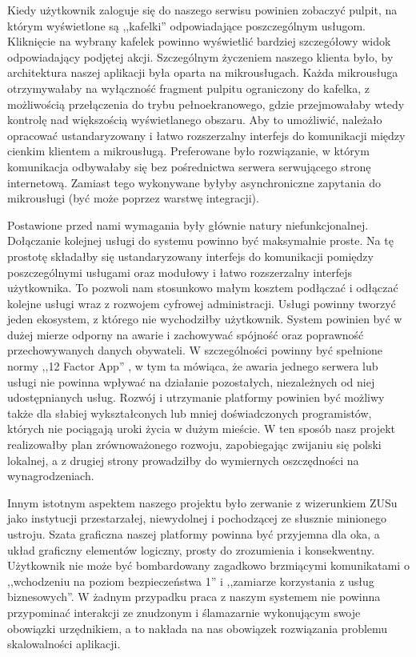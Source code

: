 \documentclass[licencjacka]{pracamgr}
\begin{document}
Kiedy użytkownik zaloguje się do naszego serwisu powinien zobaczyć pulpit, na którym wyświetlone są ,,kafelki''
odpowiadające poszczególnym usługom. Kliknięcie na wybrany kafelek powinno wyświetlić bardziej szczegółowy widok
odpowiadający podjętej akcji. Szczególnym życzeniem naszego klienta było, by architektura naszej aplikacji była
oparta na mikrousługach. Każda mikrousługa otrzymywałaby na wyłączność fragment pulpitu ograniczony do kafelka,
z możliwością przełączenia do trybu pełnoekranowego, gdzie przejmowałaby wtedy kontrolę nad większością wyświetlanego
obszaru. Aby to umożliwić, należało opracować ustandaryzowany i łatwo rozszerzalny interfejs do komunikacji między
cienkim klientem a mikrousługą. Preferowane było rozwiązanie, w którym komunikacja odbywałaby się bez pośrednictwa
serwera serwującego stronę internetową. Zamiast tego wykonywane byłyby asynchroniczne zapytania do mikrousługi (być
może poprzez warstwę integracji).

Postawione przed nami wymagania były głównie natury niefunkcjonalnej. Dołączanie kolejnej usługi do systemu
powinno być maksymalnie proste. Na tę prostotę składałby się ustandaryzowany interfejs do komunikacji pomiędzy
poszczególnymi usługami oraz modułowy i łatwo rozszerzalny interfejs użytkownika.
To pozwoli nam stosunkowo małym kosztem podłączać i odłączać kolejne usługi wraz z
rozwojem cyfrowej administracji. Usługi powinny tworzyć jeden ekosystem, z którego nie wychodziłby użytkownik. System
powinien być w dużej mierze odporny na awarie i zachowywać spójność oraz poprawność przechowywanych danych obywateli.
W szczególności powinny być spełnione normy ,,12 Factor App'' \cite{tfa}, w tym ta mówiąca, że awaria jednego serwera
lub usługi nie powinna wpływać na działanie pozostałych, niezależnych od niej udostępnianych usług.
Rozwój i utrzymanie platformy powinien być możliwy także dla słabiej wykształconych lub mniej doświadczonych
programistów, których nie pociągają uroki życia w dużym mieście. W ten sposób nasz projekt realizowałby plan
zrównoważonego rozwoju, zapobiegając zwijaniu się polski lokalnej, a z drugiej strony prowadziłby do wymiernych
oszczędności na wynagrodzeniach.

Innym istotnym aspektem naszego projektu było zerwanie z wizerunkiem ZUSu jako instytucji przestarzałej, niewydolnej
i pochodzącej ze słusznie minionego ustroju. Szata graficzna naszej platformy powinna być przyjemna dla oka, a układ
graficzny elementów logiczny, prosty do zrozumienia i konsekwentny. Użytkownik nie może być bombardowany zagadkowo
brzmiącymi komunikatami o ,,wchodzeniu na poziom bezpieczeństwa 1'' i ,,zamiarze korzystania z usług biznesowych''.
W żadnym przypadku praca z naszym systemem nie
powinna przypominać interakcji ze znudzonym i ślamazarnie wykonującym swoje obowiązki urzędnikiem, a to nakłada na
nas obowiązek rozwiązania problemu skalowalności aplikacji.
\end{document}
